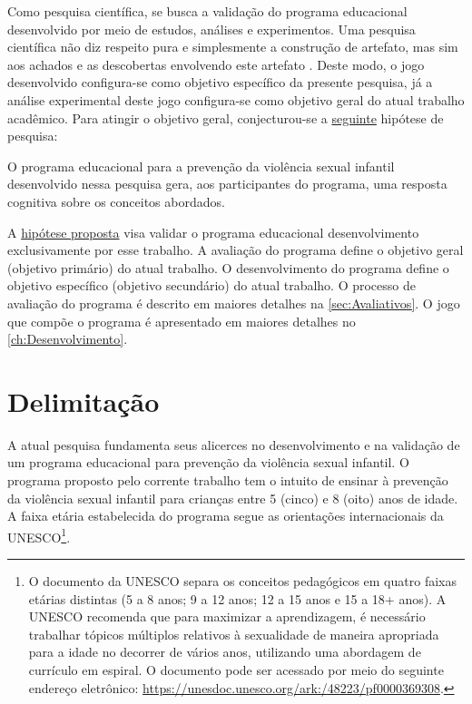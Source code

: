 Como pesquisa científica, se busca a validação do programa educacional desenvolvido por meio de estudos, análises e experimentos. Uma pesquisa científica não diz respeito pura e simplesmente a construção de artefato, mas sim aos achados e as descobertas envolvendo este artefato \cite{wazlawick2014metodologia}. Deste modo, o jogo desenvolvido configura-se como objetivo específico da presente pesquisa, já a análise experimental deste jogo configura-se como objetivo geral do atual trabalho acadêmico. Para atingir o objetivo geral, conjecturou-se a \hyperref[hipotese]{seguinte} hipótese de pesquisa: 

\vspace{0.5cm}

\begin{framed}
	\noindent
	\large{O programa educacional para a prevenção da violência sexual infantil desenvolvido nessa pesquisa gera, aos participantes do programa, uma resposta cognitiva sobre os conceitos abordados.}
\end{framed}

\vspace{0.5cm}

A \hyperref[hipotese]{hipótese proposta} visa validar o programa educacional desenvolvimento exclusivamente por esse trabalho. A avaliação do programa define o objetivo geral (objetivo primário) do atual trabalho. O desenvolvimento do programa define o objetivo específico (objetivo secundário) do atual trabalho. O processo de avaliação do programa é descrito em maiores detalhes na \autoref{sec:Avaliativos}. O jogo que compõe o programa é apresentado em maiores detalhes no \autoref{ch:Desenvolvimento}. %


\section{Delimitação}\label{sec:Escopo}

A atual pesquisa fundamenta seus alicerces no desenvolvimento e na validação de um programa educacional para prevenção da violência sexual infantil. O programa proposto pelo corrente trabalho tem o intuito de ensinar à prevenção da violência sexual infantil para crianças entre 5 (cinco) e 8 (oito) anos de idade. A faixa etária estabelecida do programa segue as orientações internacionais da \ac{UNESCO}\footnote{O documento da UNESCO separa os conceitos pedagógicos em quatro faixas etárias distintas (5 a 8 anos; 9 a 12 anos; 12 a 15 anos e 15 a 18+ anos). A \ac{UNESCO} recomenda que para maximizar a aprendizagem, é necessário trabalhar tópicos múltiplos relativos à sexualidade de maneira apropriada para a idade no decorrer de vários anos, utilizando uma abordagem de currículo em espiral. O documento pode ser acessado por meio do seguinte endereço eletrônico: \url{https://unesdoc.unesco.org/ark:/48223/pf0000369308}.}. 

